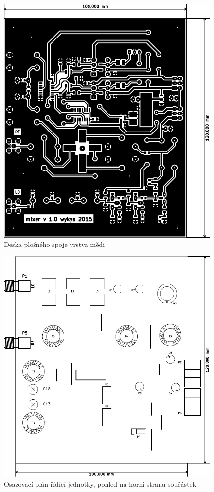\begin{figure}[H]
	\centering
	\includegraphics[width=170mm]{img/mix/cu_b.pdf}
	\caption{Deska plošného spoje vrstva mědi}    		
\end{figure}

\begin{figure}[H]
	\centering
	\includegraphics[width=170mm]{img/mix/os_f.pdf}
	\caption{Osazovací plán řídící jednotky, pohled na horní stranu součástek}    		
\end{figure}

